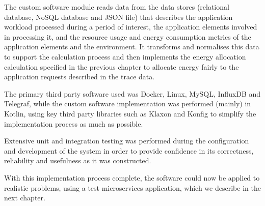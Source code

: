 The custom software module reads data from the data stores (relational database, NoSQL database and JSON file) that describes the application workload processed during a period of interest, the application elements involved in processing it, and the resource usage and energy consumption metrics of the application elements and the environment.  It transforms and normalises this data to support the calculation process and then implements the energy allocation calculation specified in the previous chapter to allocate energy fairly to the application requests described in the trace data.

The primary third party software used was Docker, Linux, MySQL, InfluxDB and Telegraf, while the custom software implementation was performed (mainly) in Kotlin, using key third party libraries such as Klaxon and Konfig to simplify the implementation process as much as possible.

Extensive unit and integration testing was performed during the configuration and development of the system in order to provide confidence in its correctness, reliability and usefulness as it was constructed.

With this implementation process complete, the software could now be applied to realistic problems, using a test microservices application, which we describe in the next chapter.


